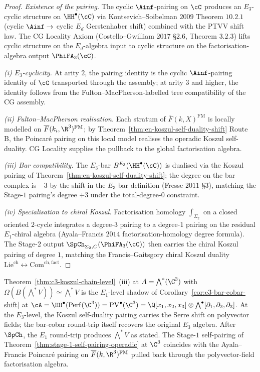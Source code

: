 \begin{proof}
\emph{Existence of the pairing.} The cyclic $\Ainf$-pairing on $\cC$
produces an $E_3$-cyclic structure on $\HH^\bullet(\cC)$ via
Kontsevich--Soibelman $2009$ Theorem $10.2.1$ (cyclic
$\Ainf \to$ cyclic $E_d$ Gerstenhaber shift) combined with the PTVV
shift law. The CG Locality Axiom (Costello--Gwilliam $2017$ \S$2.6$,
Theorem $3.2.3$) lifts cyclic structure on the $E_d$-algebra input to
cyclic structure on the factorisation-algebra output $\PhiFA_3(\cC)$.

\emph{(i) $E_3$-cyclicity.} At arity $2$, the pairing identity is
the cyclic $\Ainf$-pairing identity of $\cC$ transported through the
assembly; at arity $3$ and higher, the identity follows from the
Fulton--MacPherson-labelled tree compatibility of the CG assembly.

\emph{(ii) Fulton--MacPherson realisation.} Each stratum of
$\overline{F}(k, X)^{\mathrm{FM}}$ is locally modelled on
$\overline{F}(k_i, \R^3)^{\mathrm{FM}}$; by
Theorem~\ref{thm:en-koszul-self-duality-shift} Route B, the Poincar\'e
pairing on this local model realises the operadic Koszul self-duality.
CG Locality supplies the pullback to the global factorisation algebra.

\emph{(iii) Bar compatibility.} The $E_3$-bar $B^{E_3}(\HH^\bullet(\cC))$
is dualised via the Koszul pairing of
Theorem~\ref{thm:en-koszul-self-duality-shift}; the degree on the bar
complex is $-3$ by the shift in the $E_3$-bar definition
(Fresse $2011$ \S$3$), matching the Stage-$1$ pairing's degree $+3$
under the total-degree-$0$ constraint.

\emph{(iv) Specialisation to chiral Koszul.} Factorisation homology
$\int_{\Sigma_2}$ on a closed oriented $2$-cycle integrates a
degree-$3$ pairing to a degree-$1$ pairing on the residual $E_1$-chiral
algebra (Ayala--Francis $2014$ factorisation-homology degree formula).
The Stage-$2$ output $\SpCh_{\Sigma_2, C}(\PhiFA_3(\cC))$ then carries
the chiral Koszul pairing of degree $1$, matching the
Francis--Gaitsgory chiral Koszul duality $\mathrm{Lie}^{\mathrm{ch}} \leftrightarrow \mathrm{Com}^{\mathrm{ch, fact}}$.
\end{proof}

\begin{remark}
\label{rem:c3-recovered-from-operadic}
Theorem~\ref{thm:c3-koszul-chain-level}~(iii) at
$A = \bigwedge^*(\C^3)$ with $\Omega(B(\bigwedge^* V)) \simeq \bigwedge^* V$
is the $E_1$-level shadow of
Corollary~\ref{cor:e3-bar-cobar-shift} at
$\cA = \HH^\bullet(\mathrm{Perf}(\C^3)) = \mathrm{PV}^\bullet(\C^3)
= \Q[x_1, x_2, x_3] \otimes \bigwedge^\bullet[\partial_1, \partial_2, \partial_3]$.
At the $E_3$-level, the Koszul self-duality pairing carries the Serre
shift on polyvector fields; the bar-cobar round-trip itself recovers
the original $E_3$ algebra. After $\SpCh$, the $E_1$ round-trip produces
$\bigwedge^* V$ as stated.
The Stage-$1$ self-pairing of
Theorem~\ref{thm:stage-1-self-pairing-operadic} at $\C^3$ coincides
with the Ayala--Francis Poincar\'e pairing on
$\overline{F}(k, \R^3)^{\mathrm{FM}}$ pulled back through the
polyvector-field factorisation algebra.
\end{remark}

